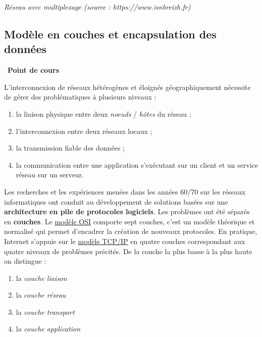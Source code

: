 \documentclass[
  11pt,
]{article}
\providecommand{\tightlist}{%
  \setlength{\itemsep}{0pt}\setlength{\parskip}{0pt}}
\newcounter{def}
\newcounter{cours}
\newenvironment{cours}[1]
{\par \medskip   \addtocounter{cours}{1} \noindent  
\begin{bclogo}[arrondi =0.1,  ombre = true, barre=none, logo=\bcbook, marge=4]{~\textbf{Point de cours} \textbf{\thecours} {\itshape #1} }  \par}
{
\end{bclogo}
 \par \bigskip }
\newcounter{logi}
\begin{document}
\emph{Réseau avec multiplexage (source : https://www.isnbreizh.fr)}

\hypertarget{moduxe8le-en-couches-et-encapsulation-des-donnuxe9es}{%
\subsection{Modèle en couches et encapsulation des
données}\label{moduxe8le-en-couches-et-encapsulation-des-donnuxe9es}}

\begin{cours}{}

L'interconnexion de réseaux hétérogènes et éloignés géographiquement
nécessite de gérer des problématiques à plusieurs niveaux :

\begin{enumerate}
\def\labelenumi{\arabic{enumi}.}
\tightlist
\item
  la liaison physique entre deux \emph{noeuds} / \emph{hôtes} du réseau
  ;
\item
  l'interconnexion entre deux réseaux locaux ;
\item
  la transmission fiable des données ;
\item
  la communication entre une application s'exécutant sur un client et un
  service réseau sur un serveur.
\end{enumerate}

Les recherches et les expériences menées dans les années 60/70 sur les
réseaux informatiques ont conduit au développement de solutions basées
sur une \textbf{architecture en pile de protocoles logiciels}. Les
problèmes ont été séparés en \textbf{couches}. Le
\href{https://fr.wikipedia.org/wiki/Mod\%C3\%A8le_OSI}{modèle OSI}
comporte sept couches, c'est un modèle théorique et normalisé qui permet
d'encadrer la création de nouveaux protocoles. En pratique, Internet
s'appuie sur le
\href{https://fr.wikipedia.org/wiki/Suite_des_protocoles_Internet}{modèle
TCP/IP} en quatre couches correspondant aux quatre niveaux de problèmes
précités. De la couche la plus basse à la plus haute on distingue :

\begin{enumerate}
\def\labelenumi{\arabic{enumi}.}
\tightlist
\item
  la \emph{couche liaison}
\item
  la \emph{couche réseau}
\item
  la \emph{couche transport}
\item
  la \emph{couche application}
\end{enumerate}


\end{cours}
\end{document}
